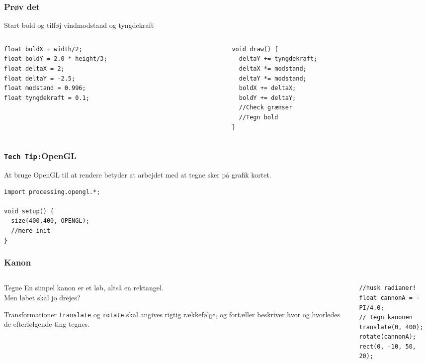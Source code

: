 \documentclass{beamer}
\begin{document}
\begin{frame}[fragile]
  \frametitle{Prøv det}
  Start bold og tilføj vindmodstand og tyngdekraft
  \begin{columns}
    \begin{column}{0.5\textwidth}
\begin{verbatim}
float boldX = width/2;
float boldY = 2.0 * height/3;
float deltaX = 2;
float deltaY = -2.5;
float modstand = 0.996;
float tyngdekraft = 0.1;
\end{verbatim}
    \end{column}
    \begin{column}{0.5\textwidth}
\begin{verbatim} 
void draw() {
  deltaY += tyngdekraft;
  deltaX *= modstand;
  deltaY *= modstand;
  boldX += deltaX;
  boldY += deltaY;
  //Check grænser
  //Tegn bold
}
\end{verbatim}

    \end{column}
  \end{columns}
\end{frame}


\begin{frame}[fragile]
  \frametitle{\texttt{Tech Tip:}OpenGL}

  At bruge OpenGL til at rendere betyder at arbejdet med at tegne sker
  på grafik kortet.

\begin{verbatim}
import processing.opengl.*;

void setup() {
  size(400,400, OPENGL);
  //mere init
}
\end{verbatim}
\end{frame}

\begin{frame}[fragile]
  \frametitle{Kanon}
  
  \begin{columns}
    \begin{column}{0.5\textwidth}
      
      \begin{block}{Tegne}
        En simpel kanon er et løb, altså en rektangel. \\
        Men løbet skal jo drejes?
      \end{block}

      \begin{block}{Transformationer}
        \texttt{translate} og \texttt{rotate} skal angives rigtig
        rækkefølge, og fortæller beskriver hvor og hvorledes de
        efterfølgende ting tegnes.
      \end{block}

      
    \end{column}
    \begin{column}{0.5\textwidth}
\begin{verbatim} 
//husk radianer!
float cannonA = -PI/4.0; 
// tegn kanonen
translate(0, 400);
rotate(cannonA); 
rect(0, -10, 50, 20);
\end{verbatim}
    \end{column}
  \end{columns}
\end{frame}
\end{document}
